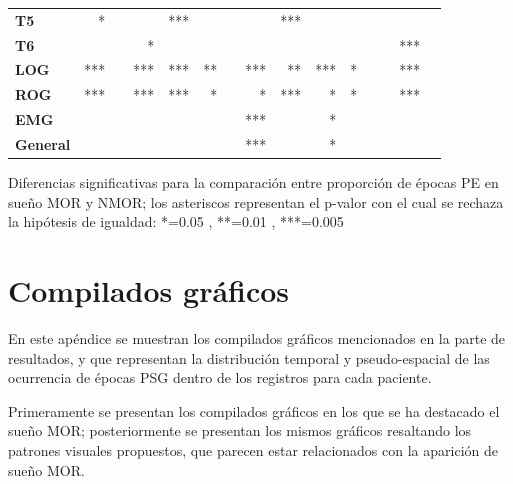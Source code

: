 \documentclass[12pt,a4paper]{mitthesis}
\begin{document}
\begin{SidewaysTable}
\begin{tabular}{lrrrrrcrrrrcrrr}
\rowcolor{gris}
\textbf{T5} &*  & &   &***&  &&   &***&   & && & &  \\
\rowcolor{gris}
\textbf{T6} &   & &*  &   &  &&   &   &   & && &***&  \\
\textbf{LOG}&***& &***&***&**&&***&** &***&*&& &***&  \\
\textbf{ROG}&***& &***&***&* &&*  &***&*  &*&& &***&  \\
\textbf{EMG}&   & &   &   &  &&***&   &*  & && & &  \\
\rowcolor{gris2}
\textbf{General}& & & & & &&***& &*& && & & \\
\bottomrule
\end{tabular}
\caption{Diferencias significativas para la comparaci\'on entre proporci\'on de \'epocas PE en
sue\~no MOR y NMOR; los asteriscos representan el p-valor con el cual se rechaza la hip\'otesis 
de igualdad: *=0.05 , **=0.01 , ***=0.005}
\label{comparacion_mor_vs_total}
\end{SidewaysTable}


\chapter{Compilados gr\'aficos}

En este ap\'endice se muestran los compilados gr\'aficos mencionados en la parte de resultados,
y que representan la
distribuci\'on temporal y pseudo-espacial de las ocurrencia de \'epocas PSG dentro de los registros 
para cada paciente. 

Primeramente se presentan los compilados gr\'aficos en los que se ha destacado el sue\~no MOR;
posteriormente se presentan los mismos gr\'aficos resaltando los patrones visuales
propuestos, que parecen estar relacionados con la aparici\'on de sue\~no MOR.

\end{document}
